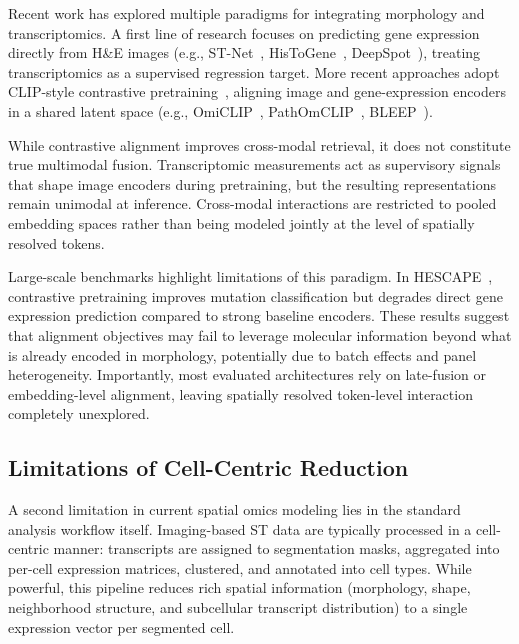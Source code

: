 Recent work has explored multiple paradigms for integrating morphology and transcriptomics. A first line of research focuses on predicting gene expression directly from H\&E images (e.g., ST-Net~\cite{he_integratingspatialgene_2020}, HisToGene~\cite{pang_leveraginginformationspatial_2021}, DeepSpot~\cite{nonchev_deepspotleveragingspatial_2025}), treating transcriptomics as a supervised regression target. More recent approaches adopt CLIP-style contrastive pretraining~\cite{radford_learningtransferablevisual_2021}, aligning image and gene-expression encoders in a shared latent space (e.g., OmiCLIP~\cite{chen_visualomicsfoundation_2025}, PathOmCLIP~\cite{lee_pathomclipconnectingtumor_2024}, \linebreak BLEEP~\cite{xie_spatiallyresolvedgene_2023}).


While contrastive alignment improves cross-modal retrieval, it does not constitute true multimodal fusion. Transcriptomic measurements act as supervisory signals that shape image encoders during pretraining, but the resulting representations remain unimodal at inference. Cross-modal interactions are restricted to pooled embedding spaces rather than being modeled jointly at the level of spatially resolved tokens. 

Large-scale benchmarks highlight limitations of this paradigm. In HESCAPE~\cite{gindra_largescalebenchmarkcrossmodal_2025}, contrastive pretraining improves mutation classification but degrades direct gene expression prediction compared to strong baseline encoders. These results suggest that alignment objectives may fail to leverage molecular information beyond what is already encoded in morphology, potentially due to batch effects and panel heterogeneity. Importantly, most evaluated architectures rely on late-fusion or embedding-level alignment, leaving spatially resolved token-level interaction completely unexplored.

\subsection*{Limitations of Cell-Centric Reduction}
\label{sec:limitations-of-cell-centric-reduction}

A second limitation in current spatial omics modeling lies in the standard analysis workflow itself. Imaging-based ST data are typically processed in a cell-centric manner: transcripts are assigned to segmentation masks, aggregated into per-cell expression matrices, clustered, and annotated into cell types. While powerful, this pipeline reduces rich spatial information (morphology, shape, neighborhood structure, and subcellular transcript distribution) to a single expression vector per segmented cell. 

